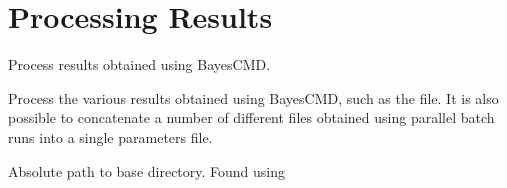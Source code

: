 \documentclass[letterpaper,10pt,english]{sphinxmanual}
\begin{document}
\section{Processing Results}
\label{\detokenize{misc:module-bayescmd.results_handling}}\label{\detokenize{misc:processing-results}}
Process results obtained using BayesCMD.

Process the various results obtained using BayesCMD, such as the
 file. It is also possible to concatenate a number of different
 files obtained using parallel batch runs into a single
parameters file.

\begin{fulllineitems}
\label{\detokenize{misc:bayescmd.results_handling.BAYESCMD}}
 \textendash{} Absolute path to base directory. Found using
{\hyperref[\detokenize{misc:bayescmd.util.findBaseDir}]{}}

\end{fulllineitems}

\end{document}
